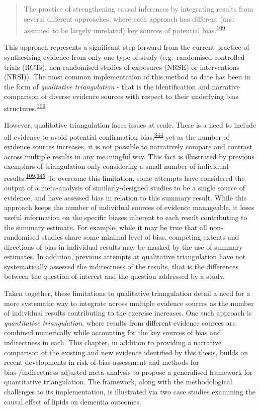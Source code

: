 \documentclass[a4paper, twoside]{templates/ociamthesis}
\begin{document}
\begin{quote}
The practice of strengthening causal inferences by integrating results from several different approaches, where each approach has different (and assumed to be largely unrelated) key sources of potential bias.\textsuperscript{\protect\hyperlink{ref-lawlor2016}{109}}
\end{quote}

This approach represents a significant step forward from the current practice of synthesising evidence from only one type of study (e.g.~randomised controlled trials (RCTs), non-randomised studies of exposures (NRSE) or interventions (NRSI)). The most common implementation of this method to date has been in the form of \emph{qualitative triangulation} - that is the identification and narrative comparison of diverse evidence sources with respect to their underlying bias structures.\textsuperscript{\protect\hyperlink{ref-lawlor2016}{109}}

However, qualitative triangulation faces issues at scale. There is a need to include all evidence to avoid potential confirmation bias,\textsuperscript{\protect\hyperlink{ref-dubroff2018}{344}} yet as the number of evidence sources increases, it is not possible to narratively compare and contrast across multiple results in any meaningful way. This fact is illustrated by previous exemplars of triangulation only considering a small number of individual results.\textsuperscript{\protect\hyperlink{ref-lawlor2016}{109},\protect\hyperlink{ref-ference2014}{345}} To overcome this limitation, some attempts have considered the output of a meta-analysis of similarly-designed studies to be a single source of evidence, and have assessed bias in relation to this summary result. While this approach keeps the number of individual sources of evidence manageable, it loses useful information on the specific biases inherent to each result contributing to the summary estimate. For example, while it may be true that all non-randomised studies share some minimal level of bias, competing extents and directions of bias in individual results may be masked by the use of summary estimates. In addition, previous attempts at qualitative triangulation have not systematically assessed the indirectness of the results, that is the differences between the question of interest and the question addressed by a study.

Taken together, these limitations to qualitative triangulation detail a need for a more systematic way to integrate across multiple evidence sources as the number of individual results contributing to the exercise increases. One such approach is \emph{quantitative triangulation}, where results from different evidence sources are combined numerically while accounting for the key sources of bias and indirectness in each. This chapter, in addition to providing a narrative comparison of the existing and new evidence identified by this thesis, builds on recent developments in risk-of-bias assessment and methods for bias-/indirectness-adjusted meta-analysis to propose a generalised framework for quantitative triangulation. The framework, along with the methodological challenges to its implementation, is illustrated via two case studies examining the causal effect of lipids on dementia outcomes.
\end{document}
